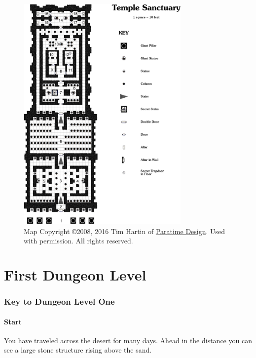 \documentclass[letterpaper,serif]{rpg-module}
\begin{document}
\begin{figure}[p]
\centering
\includegraphics[width=0.75\textwidth]{rpg_module_map.png}
\vspace{5ex}
\caption*{Map Copyright \copyright 2008, 2016 Tim Hartin of
\href{http://paratime.ca}{Paratime Design}. Used with permission. All rights reserved.}
\label{img:map}
\end{figure}

\part{First Dungeon Level}
\label{example_dungeon}

\section*{Key to Dungeon Level One}

\subsection*{Start}

\begin{boxtext}
You have traveled across the desert for many days. Ahead in the distance you can see a large stone
structure rising above the sand.
\end{boxtext}
\end{document}
